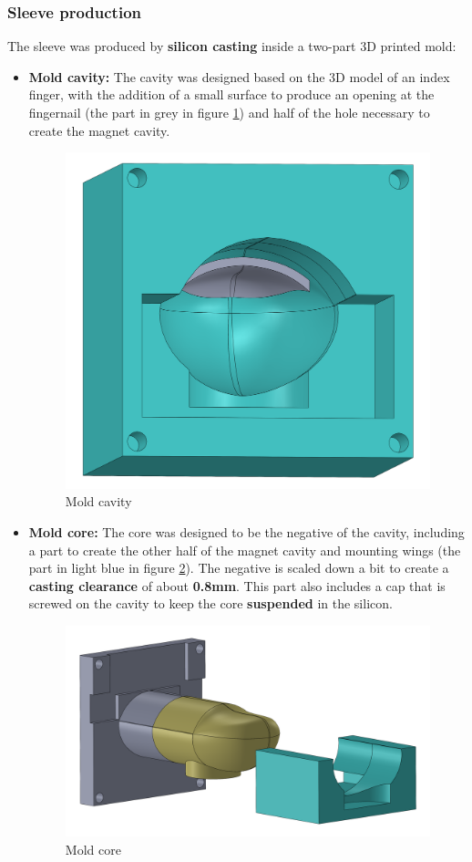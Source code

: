 \subsubsection{Sleeve production}
\label{sec: Sleeve_production}

\begin{samepage}
    The sleeve was produced by \textbf{silicon casting} inside a two-part 3D printed mold:
    \nopagebreak

    \begin{itemize}
        \item \textbf{Mold cavity: } The cavity was designed based on the 3D model of an index finger, with the addition of a small surface to produce an opening at the fingernail (the part in grey in figure \ref{fig: mold_cavity}) and half of the hole necessary to create the magnet cavity.
        \begin{figure}[H]
            \centering
            \includegraphics[width=0.4\linewidth]{Chapters/Chapter5/Rigid_Prototypes/Figures/silicon_finger_mold_cavity.PNG}
            \caption{Mold cavity}
            \label{fig: mold_cavity}
        \end{figure}

        \item \textbf{Mold core: } The core was designed to be the negative of the cavity, including a part to create the other half of the magnet cavity and mounting wings (the part in light blue in figure \ref{fig: mold_core}).
        The negative is scaled down a bit to create a \textbf{casting clearance} of about \textbf{0.8mm}.
        This part also includes a cap that is screwed on the cavity to keep the core \textbf{suspended} in the silicon.
        \begin{figure}[H]
            \centering
            \includegraphics[width=0.5\linewidth]{Chapters/Chapter5/Rigid_Prototypes/Figures/silicon_finger_mold_core.PNG}
            \caption{Mold core}
            \label{fig: mold_core}
        \end{figure}
    \end{itemize}
\end{samepage}


